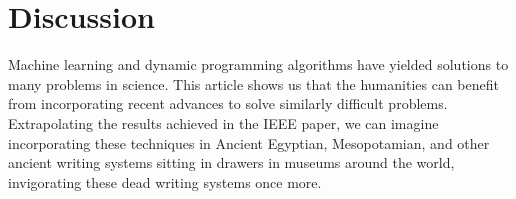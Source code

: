 \documentclass[a4paper,twoside,twocolumn]{article}
\begin{document}
\section{Discussion}
\label{sec-4}
Machine  learning  and  dynamic programming  algorithms  have  yielded
solutions to many problems in science.  This article shows us that the
humanities  can benefit  from incorporating  recent advances  to solve
similarly difficult  problems. Extrapolating  the results  achieved in
the  IEEE paper,  we  can imagine  incorporating  these techniques  in
Ancient  Egyptian, Mesopotamian,  and  other  ancient writing  systems
sitting in  drawers in  museums around  the world,  invigorating these
dead writing systems once more.



\end{document}
